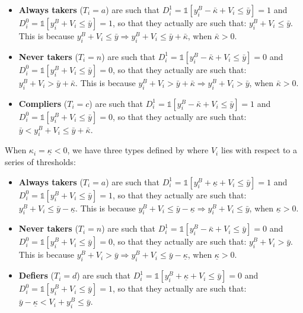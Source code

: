 \documentclass[]{book}
\providecommand{\tightlist}{%
  \setlength{\itemsep}{0pt}\setlength{\parskip}{0pt}}
\newcommand{\uns}[1]{\mathds{1}[ #1 ]}
\theoremstyle{definition}
\theoremstyle{definition}
\theoremstyle{definition}
\theoremstyle{remark}
\begin{document}
\begin{itemize}
\tightlist
\item
  \textbf{Always takers} (\(T_i=a\)) are such that \(D^1_i=\uns{y_i^B-\bar{\kappa} + V_i\leq\bar{y}}=1\) and \(D^0_i=\uns{y_i^B + V_i\leq\bar{y}}=1\), so that they actually are such that: \(y_i^B+V_i\leq\bar{y}\).
  This is because \(y_i^B+V_i\leq\bar{y} \Rightarrow y_i^B+V_i\leq\bar{y}+\bar{\kappa}\), when \(\bar{\kappa}>0\).
\item
  \textbf{Never takers} (\(T_i=n\)) are such that \(D^1_i=\uns{y_i^B-\bar{\kappa} + V_i\leq\bar{y}}=0\) and \(D^0_i=\uns{y_i^B + V_i\leq\bar{y}}=0\), so that they actually are such that: \(y_i^B+V_i>\bar{y}+\bar{\kappa}\).
  This is because \(y_i^B+V_i>\bar{y}+\bar{\kappa} \Rightarrow y_i^B+V_i>\bar{y}\), when \(\bar{\kappa}>0\).
\item
  \textbf{Compliers} (\(T_i=c\)) are such that \(D^1_i=\uns{y_i^B-\bar{\kappa} + V_i\leq\bar{y}}=1\) and \(D^0_i=\uns{y_i^B + V_i\leq\bar{y}}=0\), so that they actually are such that: \(\bar{y}<y_i^B+V_i\leq\bar{y}+\bar{\kappa}\).
\end{itemize}

When \(\kappa_i=\underline{\kappa}<0\), we have three types defined by where \(V_i\) lies with respect to a series of thresholds:

\begin{itemize}
\tightlist
\item
  \textbf{Always takers} (\(T_i=a\)) are such that \(D^1_i=\uns{y_i^B+\underline{\kappa} + V_i\leq\bar{y}}=1\) and \(D^0_i=\uns{y_i^B + V_i\leq\bar{y}}=1\), so that they actually are such that: \(y_i^B+V_i\leq\bar{y}-\underline{\kappa}\).
  This is because \(y_i^B+V_i\leq\bar{y}-\underline{\kappa} \Rightarrow y_i^B+V_i\leq\bar{y}\), when \(\underline{\kappa}>0\).
\item
  \textbf{Never takers} (\(T_i=n\)) are such that \(D^1_i=\uns{y_i^B-\bar{\kappa} + V_i\leq\bar{y}}=0\) and \(D^0_i=\uns{y_i^B + V_i\leq\bar{y}}=0\), so that they actually are such that: \(y_i^B+V_i>\bar{y}\).
  This is because \(y_i^B+V_i>\bar{y} \Rightarrow y_i^B+V_i\leq\bar{y}-\underline{\kappa}\), when \(\underline{\kappa}>0\).
\item
  \textbf{Defiers} (\(T_i=d\)) are such that \(D^1_i=\uns{y_i^B+\underline{\kappa} + V_i\leq\bar{y}}=0\) and \(D^0_i=\uns{y_i^B + V_i\leq\bar{y}}=1\), so that they actually are such that: \(\bar{y}-\underline{\kappa}<V_i+y_i^B\leq\bar{y}\).
\end{itemize}
\end{document}
